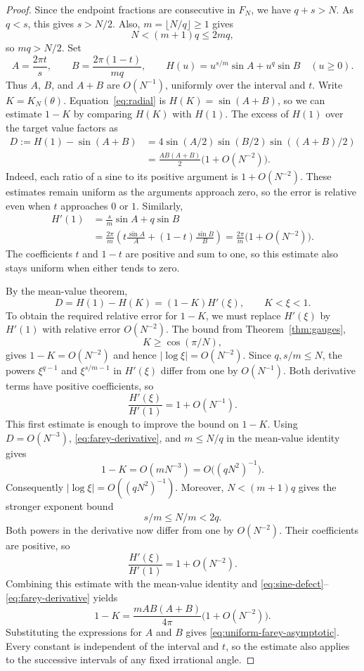 \documentclass[11pt,a4paper]{article}
\theoremstyle{definition}
\theoremstyle{remark}
\numberwithin{equation}{section}
\begin{document}
\begin{proof}
Since the endpoint fractions are consecutive in $F_N$, we have $q+s>N$. As $q<s$, this gives $s>N/2$. Also, $m=\lfloor N/q\rfloor\ge1$ gives
\[
 N<(m+1)q\le2mq,
\]
so $mq>N/2$. Set
\[
 A=\frac{2\pi t}{s},\qquad
 B=\frac{2\pi(1-t)}{mq},\qquad
 H(u)=u^{s/m}\sin A+u^q\sin B\quad(u\ge0).
\]
Thus $A$, $B$, and $A+B$ are $O(N^{-1})$, uniformly over the interval and $t$. Write $K=K_N(\theta)$. Equation~\eqref{eq:radial} is $H(K)=\sin(A+B)$, so we can estimate $1-K$ by comparing $H(K)$ with $H(1)$.
The excess of $H(1)$ over the target value factors as
\begin{equation}\label{eq:sine-defect}
 \begin{split}
 D:=H(1)-\sin(A+B)
 &=4\sin(A/2)\sin(B/2)\sin((A+B)/2)\\
 &=\frac{AB(A+B)}2\bigl(1+O(N^{-2})\bigr).
 \end{split}
\end{equation}
Indeed, each ratio of a sine to its positive argument is $1+O(N^{-2})$. These estimates remain uniform as the arguments approach zero, so the error is relative even when $t$ approaches $0$ or $1$.
Similarly,
\begin{equation}\label{eq:farey-derivative}
 \begin{split}
 H'(1)&=\frac{s}{m}\sin A+q\sin B\\
 &=\frac{2\pi}{m}
   \left(t\frac{\sin A}{A}+(1-t)\frac{\sin B}{B}\right)
 =\frac{2\pi}{m}\bigl(1+O(N^{-2})\bigr).
 \end{split}
\end{equation}
The coefficients $t$ and $1-t$ are positive and sum to one, so this estimate also stays uniform when either tends to zero.

By the mean-value theorem,
\[
 D=H(1)-H(K)=(1-K)H'(\xi),\qquad K<\xi<1.
\]
To obtain the required relative error for $1-K$, we must replace $H'(\xi)$ by $H'(1)$ with relative error $O(N^{-2})$. The bound from Theorem~\ref{thm:gauges},
\[
 K\ge\cos(\pi/N),
\]
gives $1-K=O(N^{-2})$ and hence $|\log\xi|=O(N^{-2})$. Since $q,s/m\le N$, the powers $\xi^{q-1}$ and $\xi^{s/m-1}$ in $H'(\xi)$ differ from one by $O(N^{-1})$. Both derivative terms have positive coefficients, so
\[
 \frac{H'(\xi)}{H'(1)}=1+O(N^{-1}).
\]
This first estimate is enough to improve the bound on $1-K$. Using $D=O(N^{-3})$, \eqref{eq:farey-derivative}, and $m\le N/q$ in the mean-value identity gives
\[
 1-K=O(mN^{-3})=O\bigl((qN^2)^{-1}\bigr).
\]
Consequently $|\log\xi|=O((qN^2)^{-1})$. Moreover, $N<(m+1)q$ gives the stronger exponent bound
\[
 s/m\le N/m<2q.
\]
Both powers in the derivative now differ from one by $O(N^{-2})$. Their coefficients are positive, so
\[
 \frac{H'(\xi)}{H'(1)}=1+O(N^{-2}).
\]
Combining this estimate with the mean-value identity and \eqref{eq:sine-defect}--\eqref{eq:farey-derivative} yields
\[
 1-K=\frac{mAB(A+B)}{4\pi}\bigl(1+O(N^{-2})\bigr).
\]
Substituting the expressions for $A$ and $B$ gives \eqref{eq:uniform-farey-asymptotic}. Every constant is independent of the interval and $t$, so the estimate also applies to the successive intervals of any fixed irrational angle.
\end{proof}
\end{document}
